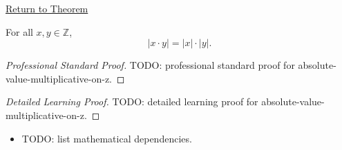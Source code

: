 \newpage
{}
\label{prf:absolute-value-multiplicative-on-z}

\begin{remark*}[Return]
\hyperref[thm:absolute-value-multiplicative-on-z]{Return to Theorem}
\end{remark*}

\begin{theorem*}
For all $x,y\in\mathbb{Z}$,
\[
|x\cdot y|=|x|\cdot |y|.
\]
\end{theorem*}

\begin{proof}[Professional Standard Proof]
\LRAProofBodyStart
TODO: professional standard proof for absolute-value-multiplicative-on-z.
\end{proof}

\begin{proof}[Detailed Learning Proof]
\LRAProofBodyStart
TODO: detailed learning proof for absolute-value-multiplicative-on-z.
\end{proof}

\begin{remark*}
\end{remark*}

\begin{dependencies}
\begin{itemize}
  \item TODO: list mathematical dependencies.
\end{itemize}
\end{dependencies}

\clearpage
